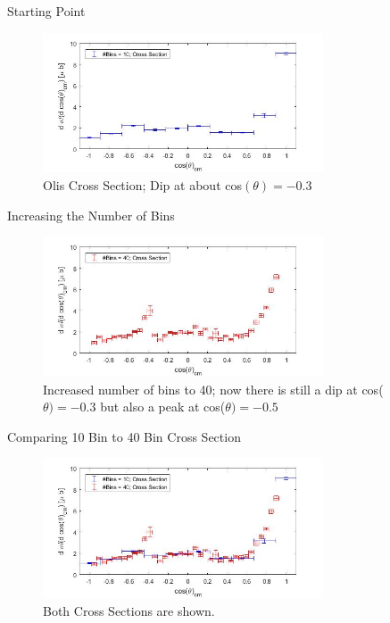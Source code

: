 \documentclass[
		10pt
		]{beamer}
\begin{document}
\begin{frame}{Starting Point}



\begin{figure}

	\centering
	\includegraphics[width=8.3cm]{Plots/1}
	\captionsetup{labelformat=empty}
	\caption{Olis Cross Section; Dip at about cos$(\theta)=-0.3$}
\end{figure}
\end{frame}


\begin{frame}{Increasing the Number of Bins}
	\begin{figure}
		\centering
		\includegraphics[width=8.3cm]{Plots/2}
		\captionsetup{labelformat=empty}
		\caption{Increased number of bins to 40; now there is still a dip at cos($\theta)=-0.3$ but also a peak at cos($\theta)=-0.5$}
	\end{figure}
\end{frame}





\begin{frame}{Comparing 10 Bin to 40 Bin Cross Section}
		
	\begin{figure}
		\centering
		\includegraphics[width=8.3cm]{Plots/3}
		\captionsetup{labelformat=empty}
		\caption{Both Cross Sections are shown.}
	\end{figure}
	
\end{frame}
\end{document}
